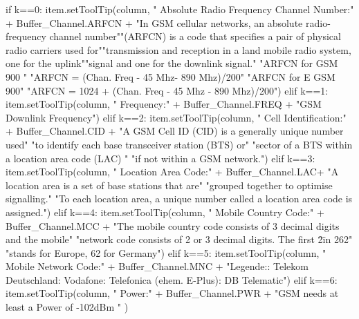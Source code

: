 \begin{code}[firstnumber=204,numbers=left,stepnumber=1,caption={Parameterinformationen},captionpos=b,label={code3}]
if k==0:
	item.setToolTip(column, " Absolute Radio Frequency Channel Number:\n\n " + Buffer_Channel.ARFCN 
	+ "\n\n In GSM cellular networks, an absolute radio-frequency channel number\n ""(ARFCN) is a code that specifies a pair of physical radio carriers used for\n ""transmission and reception in a land mobile radio system, one for the uplink\n ""signal and one for the downlink signal.\n\n "
	"ARFCN for GSM 900 \n "
	"ARFCN = (Chan. Freq - 45 Mhz- 890 Mhz)/200\n\n "
	"ARFCN for E GSM 900\n "
	"ARFCN = 1024 + (Chan. Freq - 45 Mhz - 890 Mhz)/200\n ")
elif k==1:
	item.setToolTip(column, " Frequency:\n\n " + Buffer_Channel.FREQ + "\n\n GSM Downlink Frequency")
elif k==2:
	item.setToolTip(column, " Cell Identification:\n\n " + Buffer_Channel.CID +
	"\n\n A GSM Cell ID (CID) is a generally unique number used\n "
	"to identify each base transceiver station (BTS) or\n "
	"sector of a BTS within a location area code (LAC) \n "
	"if not within a GSM network.")				
elif k==3:
	item.setToolTip(column, " Location Area Code:\n\n " + Buffer_Channel.LAC+
	"\n\n A location area is a set of base stations that are\n "
	"grouped together to optimise signalling.\n "
	"To each location area, a unique number called a location area code is assigned.\n ")				
elif k==4:
	item.setToolTip(column, " Mobile Country Code:\n\n " + Buffer_Channel.MCC +
	"\n\n The mobile country code consists of 3 decimal digits and the mobile\n "
	"network code consists of 2 or 3 decimal digits. The first \"2\" in 262\n "
	"stands for Europe, 62 for Germany")				
elif k==5:
	item.setToolTip(column, " Mobile Network Code:\n\n" + Buffer_Channel.MNC +
	"\n\n Legende:: Telekom Deutschland: Vodafone: Telefonica (ehem. E-Plus): DB Telematic")	
elif k==6:
	item.setToolTip(column, " Power:\n\n " + Buffer_Channel.PWR + 
	"\n\n GSM needs at least a Power of -102dBm " )
\end{code}
 